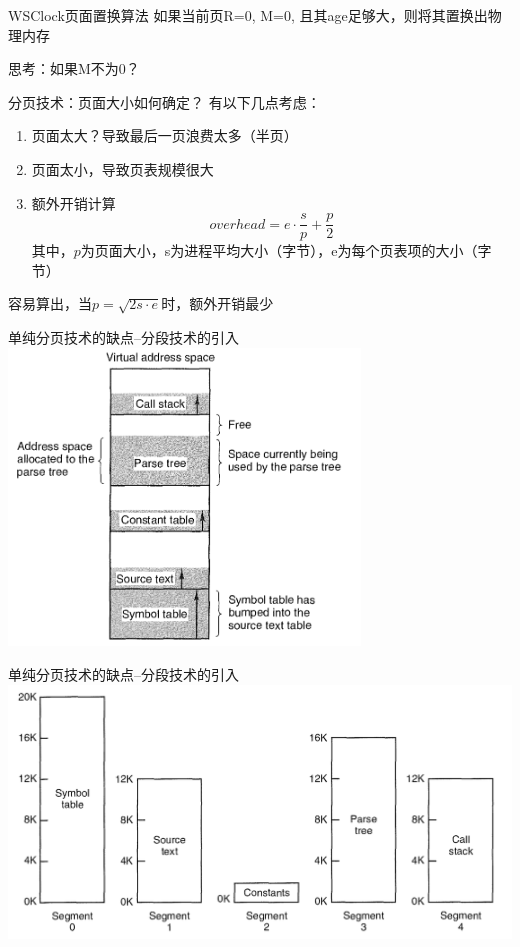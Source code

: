 \documentclass[xcolor=svgnames]{beamer}
\begin{document}
\begin{CJK*}{UTF8}{gbsn}
\begin{frame}{WSClock页面置换算法}
如果当前页R=0, M=0, 且其age足够大，则将其置换出物理内存%

思考：如果M不为0？
\end{frame}

\begin{frame}{分页技术：页面大小如何确定？}
有以下几点考虑：
\begin{enumerate}
\item 页面太大？导致最后一页浪费太多（半页）
\item 页面太小，导致页表规模很大
\item 额外开销计算
\begin{equation*}
overhead = e \cdot \frac{s}{p} + \frac{p}{2}
\end{equation*}
其中，$p$为页面大小，s为进程平均大小（字节），e为每个页表项的大小（字节）
\end{enumerate}
容易算出，当$p = \sqrt{2s\cdot e}$时，额外开销最少
\end{frame}

\begin{frame}{单纯分页技术的缺点--分段技术的引入}
\includegraphics[width=0.7\textwidth]{noseg.png}
\end{frame}

\begin{frame}{单纯分页技术的缺点--分段技术的引入}
\includegraphics[width=1.0\textwidth]{seg.png}


\end{frame}
\end{CJK*}
\end{document}
